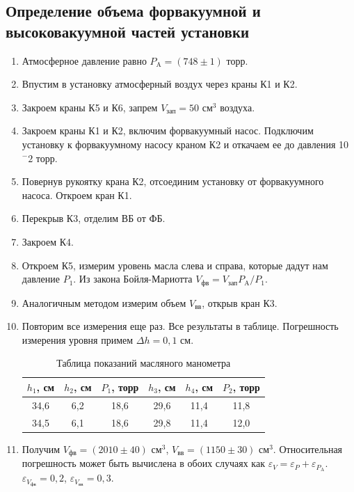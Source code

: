 \documentclass[12pt]{article}
\begin{document}
    \subsection{Определение объема форвакуумной и высоковакуумной частей
    установки}
    \begin{enumerate}
        \item Атмосферное давление равно $P_{\text{A}} = (748\pm1)$ торр.
        \item Впустим в установку атмосферный воздух через краны К1 и К2.
        \item Закроем краны К5 и К6, запрем $V_{\text{зап}} = 50$ см$^3$ 
        воздуха.
        \item Закроем краны К1 и К2, включим форвакуумный насос. Подключим
        установку к форвакуумному насосу краном К2 и откачаем ее до давления
        10$^-2$ торр.
        \item Повернув рукоятку крана К2, отсоединим установку от форвакуумного
        насоса. Откроем кран К1.
        \item Перекрыв К3, отделим ВБ от ФБ.
        \item Закроем К4.
        \item Откроем К5, измерим уровень масла слева и справа, которые
        дадут нам давление $P_1$.
        Из закона Бойля-Мариотта $V_{\text{фв}} = V_{\text{зап}}P_{\text{A}}/
        P_1$.
        \item Аналогичным методом измерим объем $V_{\text{вв}}$, открыв кран 
        К3. 
        \item Повторим все измерения еще раз. Все результаты в таблице. 
        Погрешность измерения уровня примем $\Delta h = 0{,}1$ см.
        \begin{table}[H]
            \centering
            \begin{tabular}{|c|c|c|c|c|c|}
                \hline
                $h_1$, см & $h_2$, см & $P_1$, торр & $h_3$, см & $h_4$, см & $P_2$, торр \\\hline
                34{,}6 & 6{,}2 & 18{,}6 & 29{,}6 & 11{,}4 & 11{,}8 \\\hline
                34{,}5 & 6{,}1 & 18{,}6 & 29{,}8 & 11{,}4 & 12{,}0 \\\hline
            \end{tabular}
            \caption{Таблица показаний масляного манометра}
        \end{table}
        \item Получим $V_{\text{фв}} = (2010\pm40)$ см$^3$, 
        $V_{\text{вв}} = (1150\pm30)$ см$^3$. Относительная погрешность может 
        быть вычислена в обоих случаях как $\varepsilon_V = \varepsilon_P + 
        \varepsilon_{P_{\text{A}}}$. $\varepsilon_{V_{\text{фв}}} = 0{,}2$, 
        $\varepsilon_{V_{\text{вв}}} = 0{,}3$.
        
    \end{enumerate}
\end{document}
